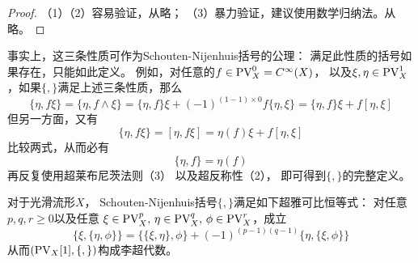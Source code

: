 









\begin{proof}
（1）（2）容易验证，从略；
（3）暴力验证，建议使用数学归纳法。从略。
\end{proof}

事实上，这三条性质可作为Schouten-Nijenhuis括号的公理：
满足此性质的括号如果存在，只能如此定义。
例如，对任意的$f\in\operatorname{PV}^0_X=C^{\infty}(X)$，
以及$\xi,\eta\in\operatorname{PV}^1_X$，如果$\{,\}$满足上述三条性质，那么
$$\{\eta,f\xi\}=\{\eta,f\wedge\xi\}=
\{\eta,f\}\xi+(-1)^{(1-1)\times 0}f\{\eta,\xi\}
=\{\eta,f\}\xi+f[\eta,\xi]$$
但另一方面，又有
$$\{\eta,f\xi\}=[\eta,f\xi]=\eta(f)\xi+f[\eta,\xi]$$
比较两式，从而必有
$$\{\eta,f\}=\eta(f)$$
再反复使用超莱布尼茨法则（3）
以及超反称性（2），
即可得到$\{,\}$的完整定义。

\begin{prop}对于光滑流形$X$，
Schouten-Nijenhuis括号$\{,\}$满足如下超雅可比恒等式：
对任意$p,q,r\geq0$以及任意
$\xi\in\operatorname{PV}^p_X,\,\eta\in\operatorname{PV}_X^q,\,\phi\in\operatorname{PV}_X^r$，成立
$$
  \{\xi,\{\eta,\phi\}\}=
  \{\{\xi,\eta\},\phi\}+(-1)^{(p-1)(q-1)}
  \{\eta,\{\xi,\phi\}\}
$$
从而$(\operatorname{PV}_X[1],\{,\})$构成李超代数。
\end{prop}

